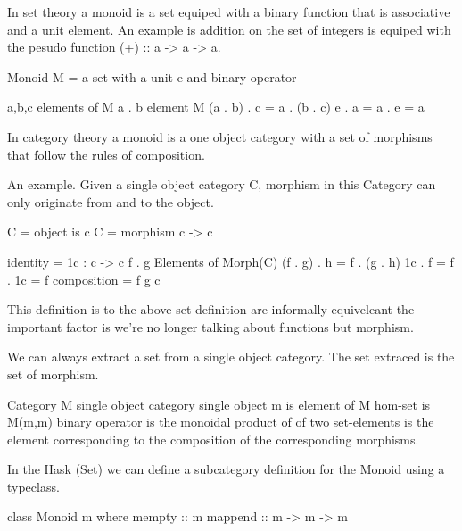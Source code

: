 \documentclass[12pt, letterpaper]{article}
\begin{document}
In set theory a monoid is a set equiped with a binary function that is associative and a unit element. An example is addition on the set of integers is equiped with the pesudo function (+) :: a -> a -> a.

Monoid M = a set with a unit e and binary operator

a,b,c elements of M
a . b element M
(a . b) . c = a . (b . c)
e . a = a . e = a

In category theory a monoid is a one object category with a set of morphisms that follow the rules of composition.

An example. Given a single object category C, morphism in this Category can only originate from and to the object.

C = object is c 
C = morphism c -> c 

identity = 1c : c -> c
f . g Elements of Morph(C)
(f . g) . h = f . (g . h)
1c . f = f . 1c = f
composition = f g c

This definition is to the above set definition are informally equiveleant the important factor is we're no longer talking about functions but morphism.

We can always extract a set from a single object category. The set extraced is the set of morphism.

Category M single object category
single object m is element of M
hom-set is M(m,m)
binary operator is the monoidal product of of two set-elements is the element corresponding to the composition of the corresponding morphisms.

In the Hask (Set) we can define a subcategory definition for the Monoid using a typeclass.

class Monoid m where
	mempty :: m
	mappend :: m -> m -> m
\end{document}
